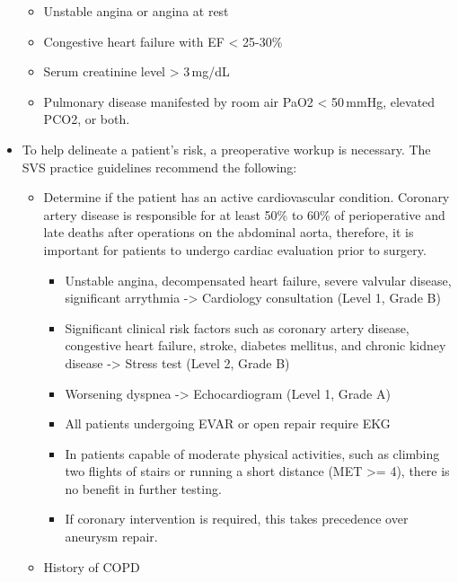 \documentclass[
]{book}
\begin{document}
\begin{itemize}
  \begin{itemize}
  \item
    Unstable angina or angina at rest
  \item
    Congestive heart failure with EF \textless{} 25-30\%
  \item
    Serum creatinine level \textgreater{} 3\,mg/dL
  \item
    Pulmonary disease manifested by room air PaO2 \textless{} 50\,mmHg,
    elevated PCO2, or both.
  \end{itemize}
\item
  To help delineate a patient's risk, a preoperative workup is
  necessary. The SVS practice guidelines recommend the following:
  \citep{chaikofSocietyVascularSurgery2018a}

  \begin{itemize}
  \item
    Determine if the patient has an active cardiovascular condition.
    Coronary artery disease is responsible for at least 50\% to 60\%
    of perioperative and late deaths after operations on the
    abdominal aorta, therefore, it is important for patients to
    undergo cardiac evaluation prior to surgery.

    \begin{itemize}
    \item
      Unstable angina, decompensated heart failure, severe
      valvular disease, significant arrythmia -\textgreater{} Cardiology
      consultation (Level 1, Grade B)
    \item
      Significant clinical risk factors such as coronary artery
      disease, congestive heart failure, stroke, diabetes
      mellitus, and chronic kidney disease -\textgreater{} Stress test (Level
      2, Grade B)
    \item
      Worsening dyspnea -\textgreater{} Echocardiogram (Level 1, Grade A)
    \item
      All patients undergoing EVAR or open repair require EKG
    \item
      In patients capable of moderate physical activities, such as
      climbing two flights of stairs or running a short distance
      (MET \textgreater= 4), there is no benefit in further testing.
    \item
      If coronary intervention is required, this takes precedence
      over aneurysm repair.
    \end{itemize}
  \item
    History of COPD


\end{itemize}
\end{itemize}
\end{document}
